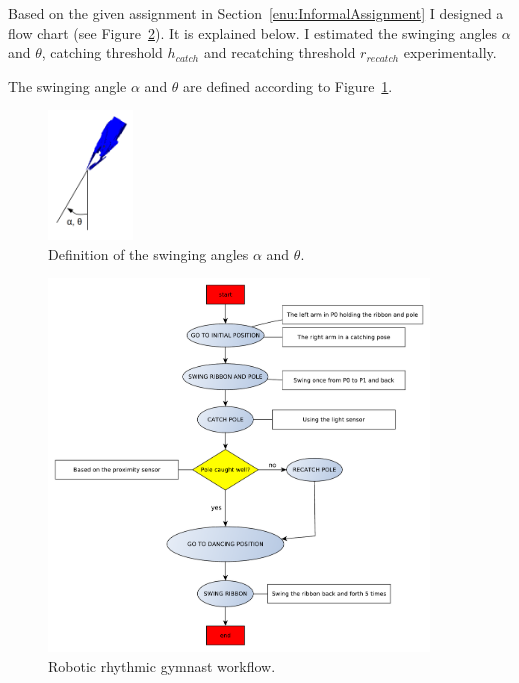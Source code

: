            Based on the given assignment in Section~\ref{enu:InformalAssignment} I designed a flow chart (see Figure~\ref{fig:Workflow}). It is explained below. I estimated the swinging angles $\alpha$ and $\theta$, catching threshold $h_{catch}$ and recatching threshold $r_{recatch}$ experimentally.

            The swinging angle $\alpha$ and $\theta$ are defined according to Figure~\ref{fig:SwingingAngle}.

            \begin{figure}[h]
            \includegraphics[width=0.2\textwidth]{SwingingAngleDef.png}
            \centering
            \caption{Definition of the swinging angles $\alpha$ and $\theta$.}
            \label{fig:SwingingAngle}
            \end{figure}

            \begin{figure}
            \includegraphics[width=0.9\textwidth]{PendulumWorkflow.pdf}
            \centering
            \caption{Robotic rhythmic gymnast workflow.}
            \label{fig:Workflow}
            \end{figure}

